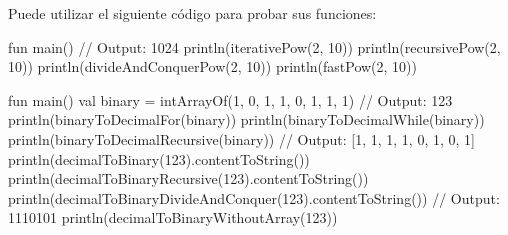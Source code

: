   Puede utilizar el siguiente código para probar sus funciones:
  \begin{kotlin}
    fun main() {
      // Output: 1024
      println(iterativePow(2, 10))
      println(recursivePow(2, 10))
      println(divideAndConquerPow(2, 10))
      println(fastPow(2, 10))
    }
  \end{kotlin}

  \begin{kotlin}
    fun main() {
      val binary = intArrayOf(1, 0, 1, 1, 0, 1, 1, 1)
      // Output: 123
      println(binaryToDecimalFor(binary))
      println(binaryToDecimalWhile(binary))
      println(binaryToDecimalRecursive(binary))
      // Output: [1, 1, 1, 1, 0, 1, 0, 1]
      println(decimalToBinary(123).contentToString())
      println(decimalToBinaryRecursive(123).contentToString())
      println(decimalToBinaryDivideAndConquer(123).contentToString())
      // Output: 1110101
      println(decimalToBinaryWithoutArray(123))
    }
  \end{kotlin}